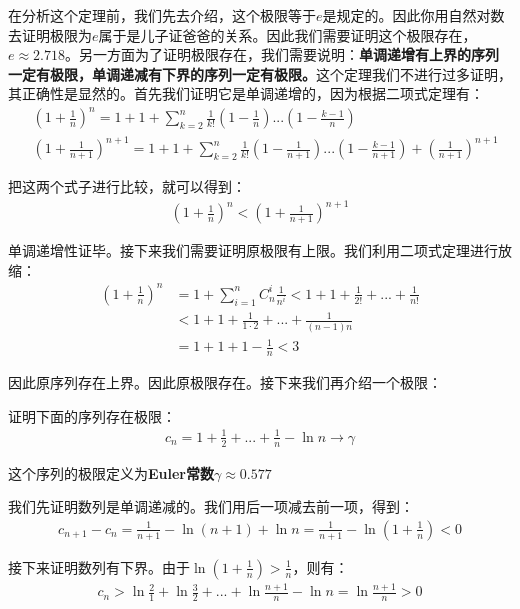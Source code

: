 \documentclass{ctexart}
\let\oldtextbf\textbf %
\renewcommand{\textbf}[1]{\textcolor{btex}{\oldtextbf{#1}}} %
\begin{document}
在分析这个定理前，我们先去介绍，这个极限等于$e$是规定的。因此你用自然对数去证明极限为$e$属于是儿子证爸爸的关系。因此我们需要证明这个极限存在，$e\approx 2.718$。另一方面为了证明极限存在，我们需要说明：\textbf{\color{btex}单调递增有上界的序列一定有极限，单调递减有下界的序列一定有极限。}这个定理我们不进行过多证明，其正确性是显然的。首先我们证明它是单调递增的，因为根据二项式定理有：
\begin{align*}
&(1+\frac{1}{n})^n=1+1+\sum_{k=2}^n\frac{1}{k!}(1-\frac{1}{n})...(1-\frac{k-1}{n})\\
 &(1+\frac{1}{n+1})^{n+1}=1+1+\sum_{k=2}^n\frac{1}{k!}(1-\frac{1}{n+1})...(1-\frac{k-1}{n+1})+
(\frac{1}{n+1})^{n+1}     
\end{align*}

把这两个式子进行比较，就可以得到：
\begin{align*}
   (1+\frac{1}{n})^n<(1+\frac{1}{n+1})^{n+1} 
\end{align*}

单调递增性证毕。接下来我们需要证明原极限有上限。我们利用二项式定理进行放缩：
\begin{align*}
(1+\frac{1}{n})^n&=1+\sum_{i=1}^n C_{n}^i\frac{1}{n^i}<1+1+\frac{1}{2!}+...+\frac{1}{n!}\\
& <1+1+\frac{1}{1\cdot 2}+...+\frac{1}{(n-1)n} \\
&=1+1+1-\frac{1}{n}<3    
\end{align*}

因此原序列存在上界。因此原极限存在。接下来我们再介绍一个极限：
\begin{tcolorbox}[
    colback=bac1,     %
    colframe=fra1,   %
    coltitle=white,             %
    coltext=tex1,
    title=Euler常数,
    fonttitle=\bfseries,        %
arc=3mm,                     %
breakable
]
证明下面的序列存在极限：
\begin{align*}
    c_n=1+\frac{1}{2}+...+\frac{1}{n}-\ln n\to \gamma\tag{1-9}
\end{align*}

这个序列的极限定义为\textbf{\color{btex}Euler常数}$\gamma\approx 0.577$
\end{tcolorbox}

我们先证明数列是单调递减的。我们用后一项减去前一项，得到：
\begin{align*}
    c_{n+1}-c_n=\frac{1}{n+1}-\ln (n+1)+\ln n=\frac{1}{n+1}-\ln(1+\frac{1}{n})<0
\end{align*}

接下来证明数列有下界。由于$\ln(1+\frac{1}{n})>\frac{1}{n}$，则有：
\begin{align*}
    c_n>\ln\frac{2}{1}+\ln\frac{3}{2}+...+\ln\frac{n+1}{n}-\ln n=\ln\frac{n+1}{n}>0
\end{align*}
\end{document}
